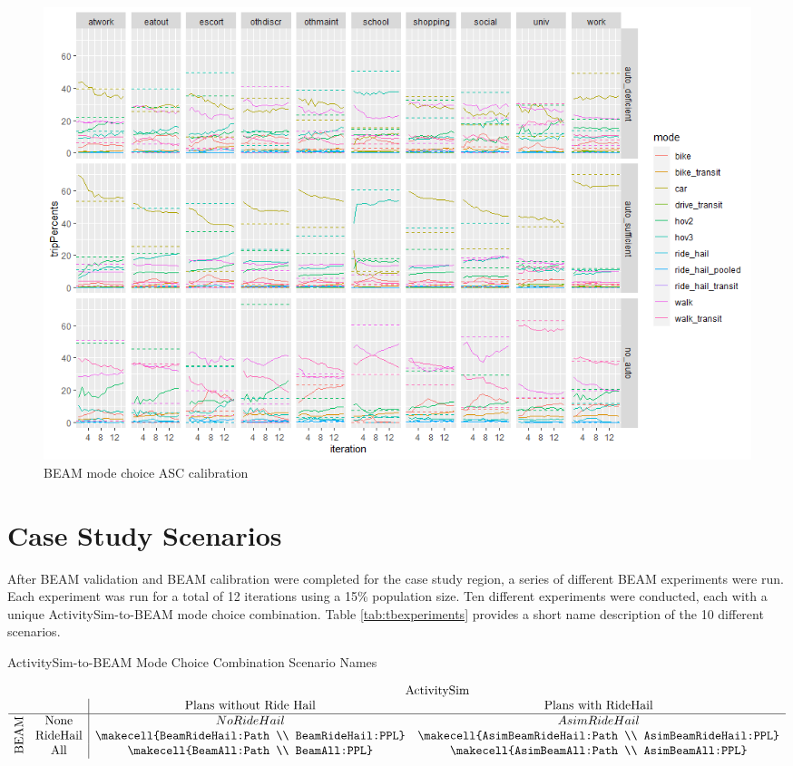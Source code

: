 \documentclass[12pt, oneside, openright]{byuthesis}
\begin{document}
\begin{figure}

{\centering \includegraphics[width=1\linewidth]{pics/BeamCalib} 

}

\caption{BEAM mode choice ASC calibration}\label{fig:fig-beam-calib}
\end{figure}

\hypertarget{meth-scenarios}{%
\section{Case Study Scenarios}\label{meth-scenarios}}

After BEAM validation and BEAM calibration were completed for the case study region, a series of different BEAM experiments were run. Each experiment was run for a total of 12 iterations using a 15\% population size. Ten different experiments were conducted, each with a unique ActivitySim-to-BEAM mode choice combination. Table \ref{tab:tbexperiments} provides a short name description of the 10 different scenarios.

\begin{table}
\caption{ActivitySim-to-BEAM Mode Choice Combination Scenario Names}
\renewcommand{\arraystretch}{2}
\[
  \begin{array}{cc|ccc}
    &\multicolumn{1}{c}{} & \multicolumn{2}{c}{\text{ActivitySim}} \\
    && \text{Plans without Ride Hail} & \text{Plans with RideHail}\\
    \hline
    & \text{None} & No RideHail & AsimRideHail \\
    \smash{\rotatebox[origin=c]{90}{\text{BEAM}}} & \text{RideHail} & \makecell{BeamRideHail:Path \\ BeamRideHail:PPL} & \makecell{AsimBeamRideHail:Path \\ AsimBeamRideHail:PPL} \\
    & \text{All} & \makecell{BeamAll:Path \\ BeamAll:PPL} & \makecell{AsimBeamAll:Path \\ AsimBeamAll:PPL}
  \end{array}
\]
\label{tab:tbexperiments}
\end{table}
\end{document}
